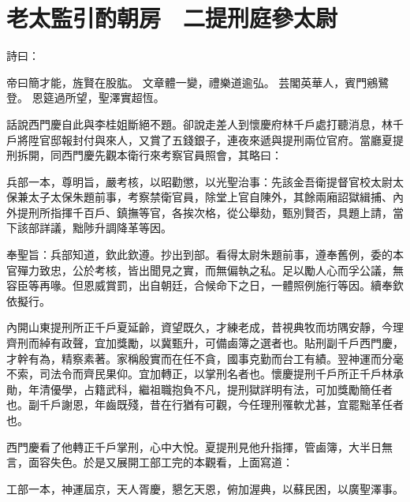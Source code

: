 %

\chapter{老太監引酌朝房　二提刑庭參太尉}

詩曰：

帝曰簡才能，旌賢在股肱。
文章體一變，禮樂道逾弘。
芸閣英華人，賓門鵷鷺登。
恩筵過所望，聖澤實超恆。

話說西門慶自此與李桂姐斷絕不題。卻說走差人到懷慶府林千戶處打聽消息，林千戶將陞官邸報封付與來人，又賞了五錢銀子，連夜來遞與提刑兩位官府。當廳夏提刑拆開，同西門慶先觀本衛行來考察官員照會，其略曰：

兵部一本，尊明旨，嚴考核，以昭勸懲，以光聖治事：先該金吾衛提督官校太尉太保兼太子太保朱題前事，考察禁衛官員，除堂上官自陳外，其餘兩廂詔獄緝捕、內外提刑所指揮千百戶、鎮撫等官，各挨次格，從公舉劾，甄別賢否，具題上請，當下該部詳議，黜陟升調降革等因。

奉聖旨：兵部知道，欽此欽遵。抄出到部。看得太尉朱題前事，遵奉舊例，委的本官殫力致忠，公於考核，皆出聞見之實，而無偏執之私。足以勵人心而孚公議，無容臣等再喙。但恩威賞罰，出自朝廷，合候命下之日，一體照例施行等因。續奉欽依擬行。

內開山東提刑所正千戶夏延齡，資望既久，才練老成，昔視典牧而坊隅安靜，今理齊刑而綽有政聲，宜加獎勵，以冀甄升，可備鹵簿之選者也。貼刑副千戶西門慶，才幹有為，精察素著。家稱殷實而在任不貪，國事克勤而台工有績。翌神運而分毫不索，司法令而齊民果仰。宜加轉正，以掌刑名者也。懷慶提刑千戶所正千戶林承勛，年清優學，占籍武科，繼祖職抱負不凡，提刑獄詳明有法，可加獎勵簡任者也。副千戶謝恩，年齒既殘，昔在行猶有可觀，今任理刑罹軟尤甚，宜罷黜革任者也。

西門慶看了他轉正千戶掌刑，心中大悅。夏提刑見他升指揮，管鹵簿，大半日無言，面容失色。於是又展開工部工完的本觀看，上面寫道：

工部一本，神運屆京，天人胥慶，懇乞天恩，俯加渥典，以蘇民困，以廣聖澤事。

